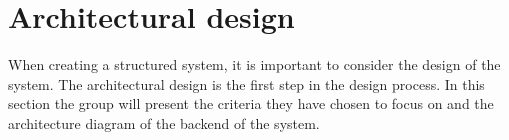 \section{Architectural design}\label{sec:architectural-design}

When creating a structured system, it is important to consider the design of the system.
The architectural design is the first step in the design process.
In this section the group will present the criteria they have chosen to focus on and the architecture diagram of the
backend of the system.



